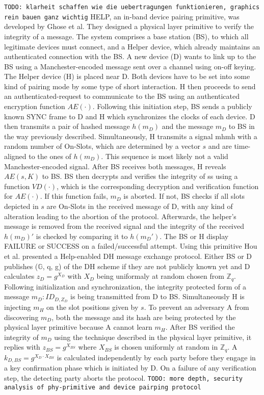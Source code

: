 \documentclass[conference]{IEEEtran}
\begin{document}
\texttt{TODO: klarheit schaffen wie die uebertragungen funktionieren, graphics rein bauen ganz wichtig}
HELP, an in-band device pairing primitive, was developed by Ghose et al. They designed a physical layer primitive to verify the integrity of a message. The system comprises a base station (BS), to which all legitimate devices must connect, and a Helper device, which already maintains an authenticated connection with the BS. A new device (D) wants to link up to the BS using a Manchester-encoded message sent over a channel using on-off keying.
The Helper device (H) is placed near D. Both devices have to be set into some kind of pairing mode by some type of short interaction. H then proceeds to send an authenticated-request to communicate to the BS using an authenticated encryption function $AE(\cdot)$. Following this initiation step, BS sends a publicly known SYNC frame to D and H which synchronizes the clocks of each device.
D then transmits a pair of hashed message $h(m_D)$ and the message $m_D$ to BS in the way previously described. Simultaneously, H transmits a signal mhmh with a random number of On-Slots, which are determined by a vector $s$ and are time-aligned to the ones of $h(m_D)$. This sequence is most likely not a valid Manchester-encoded signal.
After BS receives both messages, H reveals $AE(s,K)$ to BS. BS then decrypts and verifies the integrity of ss using a function $VD(\cdot)$, which is the corresponding decryption and verification function for $AE(\cdot)$. If this function fails, $m_D$ is aborted. If not, BS checks if all slots depicted in $s$ are On-Slots in the received message of D, with any kind of alteration leading to the abortion of the protocol.
Afterwards, the helper's message is removed from the received signal and the integrity of the received $h(m_D)'$ is checked by comparing it to $h(m_D')$. The BS or H display FAILURE or SUCCESS on a failed/successful attempt.
Using this primitive Hou et al. presented a Help-enabled DH message exchange protocol. Either BS or D publishes ($\mathbb{G}$, q, g) of the DH scheme if they are not publicly known yet and D calculates $z_D = g^{X_D}$ with $X_D$ being uniformaly at random chosen from $\mathbb{Z}_q$. Following initialization and synchronization, the integrity protected form of a message $m_D: ID_{D,Z_D}$ is being transmitted from D to BS. Simultaneously H is injecting $m_H$ on the slot positions given by $s$. To prevent an adversary A from discovering $m_D$, both the message and its hash are being protected by the physical layer primitive because A cannot learn $m_H$. After BS verified the integrity of $m_D$ using the technique described in the physical layer primitive, it replies with $z_{BS} = g^{X_{BS}}$ where $X_{BS}$ is chosen uniformly at random in $\mathbb{Z}_q$. A $k_{D,BS}=g^{X_D \cdot X_{BS}}$ is calculated independently by each party before they engage in a key confirmation phase which is initiated by D. On a failure of any verification step, the detecting party aborts the protocol. 
 \texttt{TODO: more depth, security analysis of phy-primitive and device pairping protocol}\\
\end{document}
